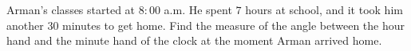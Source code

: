 Arman's classes started at $8{:}00$ a.m. He spent $7$ hours at school, and it took him another $30$ minutes to get home. Find the measure of the angle between the hour hand and the minute hand of the clock at the moment Arman arrived home.
